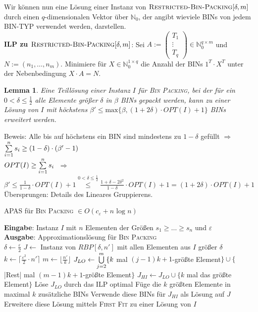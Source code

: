 \documentclass[a4paper,10pt]{scrartcl}
\newcommand{\tbf}{\textbf}
\newcommand{\tsc}{\textsc}
\newcommand{\Ra}{\Rightarrow}
\newcommand{\agn}{\leftarrow}
\newcommand{\natn}{\mathbb{N}_0}
\newcommand{\Eingabe}[1]{\STATE \tbf{Eingabe}: #1 \\}
\newcommand{\Ausgabe}[1]{\STATE \tbf{Ausgabe}: #1 \\}
\newtheorem{lemma}{Lemma}
\begin{document}
Wir können nun eine Lösung einer Instanz von $\tsc{Restricted-Bin-Packing}[\delta,m]$ durch einen $q$-dimensionalen Vektor über $\natn$, der angibt wieviele BINs von jedem BIN-TYP verwendet werden, darstellen. \\

\tbf{ILP zu $\tsc{Restricted-Bin-Packing}[\delta,m]$}: Sei $A := \begin{pmatrix} T_1 \\ \vdots \\ T_q \end{pmatrix} \in \natn^{q \times m}$ und $N := ( n_1, \ldots, n_m)$. Minimiere für $X \in \natn^{1 \times q}$ die Anzahl der BINs $1^T \cdot X^T$ unter der Nebenbedingung $X \cdot A = N$. \\

\begin{lemma}
 Eine Teillösung einer Instanz $I$ für \tsc{Bin Packing}, bei der für ein $0 < \delta \leq \frac{1}{2}$ alle Elemente größer $\delta$ in $\beta$ BINs gepackt werden, kann zu einer Lösung von $I$ mit höchstens $\beta' \leq \text{max}\{\beta, (1 + 2 \delta) \cdot OPT(I)+1\}$ BINs erweitert werden.
\end{lemma}

Beweis: Alle bis auf höchstens ein BIN sind mindestens zu $1 - \delta$ gefüllt $\Ra$ $\sum_{i=1}^n \limits s_i \geq (1 - \delta) \cdot (\beta' - 1)$ \\
$OPT(I) \geq \sum_{i=1}^n \limits s_i$ $\ \Ra \ $ $\beta' \leq \frac{1}{1 - \delta} \cdot OPT(I) + 1 \overset{0 < \delta \leq \frac{1}{2}}{\leq} \frac{1 + \delta - 2 \delta^2}{1 - \delta} \cdot OPT(I) + 1 = (1 + 2 \delta) \cdot OPT(I) + 1$ \\

Übersprungen: Details des Lineares Gruppierens. \\

\begin{algorithm}
\caption{APAS für \tsc{Bin Packing} $\in O(c_\varepsilon + n \text{ log } n)$}
\begin{algorithmic}
\Eingabe{Instanz $I$ mit $n$ Elementen der Größen $s_1 \geq \ldots \geq s_n$ und $\varepsilon$}
\Ausgabe{Approximationslösung für \tsc{Bin Packing}}
\STATE $\delta \agn \frac{\varepsilon}{2}$
\STATE $J \agn$ Instanz von $RBP[\delta, n']$ mit allen Elementen aus $I$ größer $\delta$
\STATE $k \agn \lceil \frac{\varepsilon^2}{2} \cdot n' \rceil$
\STATE $m \agn \lfloor \frac{n'}{k} \rfloor$
\STATE $J_{LO} \agn \bigcup_{j=2}^{m} \limits \{ k$ mal $(j - 1)k + 1$-größte Element$\} \cup \{$ |Rest| mal $(m - 1)k + 1$-größte Element$\}$
\STATE $J_{HI} \agn J_{LO} \cup \{ k$ mal das größte Element$\}$
\STATE Löse $J_{LO}$ durch das ILP optimal
\STATE Füge die $k$ größten Elemente in maximal $k$ zusätzliche BINs
\STATE Verwende diese BINs für $J_{HI}$ als Lösung auf $J$ 
\STATE Erweitere diese Lösung mittels \tsc{First Fit} zu einer Lösung von $I$
\end{algorithmic}
\end{algorithm}
\end{document}
